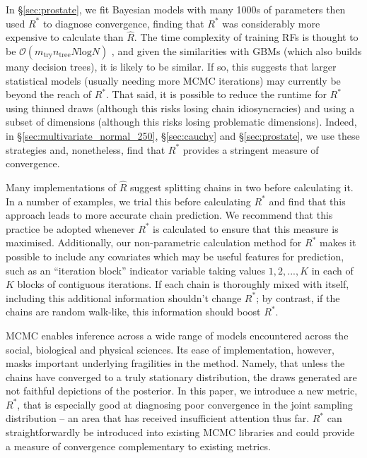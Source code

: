 \documentclass[ba]{imsart}
\numberwithin{equation}{section}
\theoremstyle{plain}
\begin{document}
In \S\ref{sec:prostate}, we fit Bayesian models with many 1000s of parameters then used $R^*$ to diagnose convergence, finding that $R^*$ was considerably more expensive to calculate than $\widehat{R}$. The time complexity of training RFs is thought to be $\mathcal{O}(m_{\text{try}} n_{\text{tree}} N \text{log} N)$ \cite[chapter~5]{louppe2014understanding}, and given the similarities with GBMs (which also builds many decision trees), it is likely to be similar. If so, this suggests that larger statistical models (usually needing more MCMC iterations) may currently be beyond the reach of $R^*$. That said, it is possible to reduce the runtime for $R^*$ using thinned draws (although this risks losing chain idiosyncracies) and using a subset of dimensions (although this risks losing problematic dimensions). Indeed, in \S\ref{sec:multivariate_normal_250}, \S\ref{sec:cauchy} and \S\ref{sec:prostate}, we use these strategies and, nonetheless, find that $R^*$ provides a stringent measure of convergence.

Many implementations of $\widehat{R}$ suggest splitting chains in two before calculating it. In a number of examples, we trial this before calculating $R^*$ and find that this approach leads to more accurate chain prediction. We recommend that this practice be adopted whenever $R^*$ is calculated to ensure that this measure is maximised. Additionally, our non-parametric calculation method for $R^*$ makes it possible to include any covariates which may be useful features for prediction, such as an ``iteration block'' indicator variable taking values $1, 2, ..., K$ in each of $K$ blocks of contiguous iterations. If each chain is thoroughly mixed with itself, including this additional information shouldn't change $R^*$; by contrast, if the chains are random walk-like, this information should boost $R^*$.

MCMC enables inference across a wide range of models encountered across the social, biological and physical sciences. Its ease of implementation, however, masks important underlying fragilities in the method. Namely, that unless the chains have converged to a truly stationary distribution, the draws generated are not faithful depictions of the posterior. In this paper, we introduce a new metric, $R^*$, that is especially good at diagnosing poor convergence in the joint sampling distribution -- an area that has received insufficient attention thus far. $R^*$ can straightforwardly be introduced into existing MCMC libraries and could provide a measure of convergence complementary to existing metrics.
	
\end{document}
